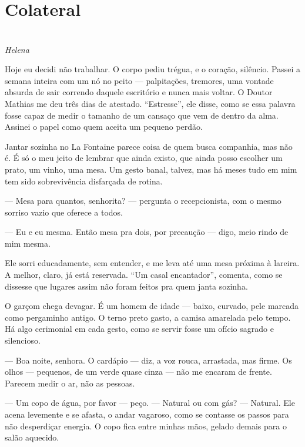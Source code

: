 \newpage

\ifdefined\useChapters
\chapter{Colateral}
\else
\chapter{}
\fi

\begin{center}
\textit{Helena}
\end{center}

Hoje eu decidi não trabalhar. O corpo pediu trégua, e o coração, silêncio.  
Passei a semana inteira com um nó no peito — palpitações, tremores, uma vontade absurda de sair correndo daquele escritório e nunca mais voltar.  
O Doutor Mathias me deu três dias de atestado. “Estresse”, ele disse, como se essa palavra fosse capaz de medir o tamanho de um cansaço que vem de dentro da alma.  
Assinei o papel como quem aceita um pequeno perdão.

\medskip

Jantar sozinha no La Fontaine parece coisa de quem busca companhia, mas não é.  
É só o meu jeito de lembrar que ainda existo, que ainda posso escolher um prato, um vinho, uma mesa.  
Um gesto banal, talvez, mas há meses tudo em mim tem sido sobrevivência disfarçada de rotina.

— Mesa para quantos, senhorita? — pergunta o recepcionista, com o mesmo sorriso vazio que oferece a todos.

— Eu e eu mesma. Então mesa pra dois, por precaução — digo, meio rindo de mim mesma.

Ele sorri educadamente, sem entender, e me leva até uma mesa próxima à lareira.  
A melhor, claro, já está reservada. “Um casal encantador”, comenta, como se dissesse que lugares assim não foram feitos pra quem janta sozinha.

\medskip

O garçom chega devagar.  
É um homem de idade — baixo, curvado, pele marcada como pergaminho antigo. O terno preto gasto, a camisa amarelada pelo tempo.  
Há algo cerimonial em cada gesto, como se servir fosse um ofício sagrado e silencioso.

— Boa noite, senhora. O cardápio — diz, a voz rouca, arrastada, mas firme.
Os olhos — pequenos, de um verde quase cinza — não me encaram de frente. Parecem medir o ar, não as pessoas.  

— Um copo de água, por favor — peço.
— Natural ou com gás?  
— Natural.
Ele acena levemente e se afasta, o andar vagaroso, como se contasse os passos para não desperdiçar energia.
O copo fica entre minhas mãos, gelado demais para o salão aquecido.

